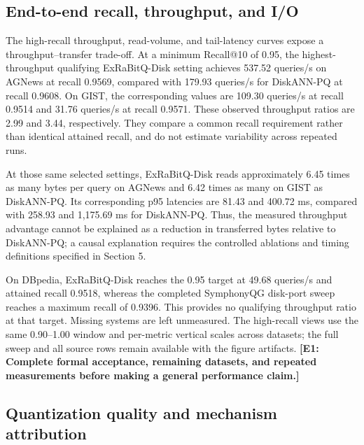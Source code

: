 \subsection{End-to-end recall, throughput, and I/O}




The high-recall throughput, read-volume, and tail-latency curves expose a throughput--transfer trade-off. At a minimum Recall@10 of 0.95, the highest-throughput qualifying ExRaBitQ-Disk setting achieves 537.52 queries/s on AGNews at recall 0.9569, compared with 179.93 queries/s for DiskANN-PQ at recall 0.9608. On GIST, the corresponding values are 109.30 queries/s at recall 0.9514 and 31.76 queries/s at recall 0.9571. These observed throughput ratios are 2.99 and 3.44, respectively. They compare a common recall requirement rather than identical attained recall, and do not estimate variability across repeated runs.

At those same selected settings, ExRaBitQ-Disk reads approximately 6.45 times as many bytes per query on AGNews and 6.42 times as many on GIST as DiskANN-PQ. Its corresponding p95 latencies are 81.43 and 400.72 ms, compared with 258.93 and 1,175.69 ms for DiskANN-PQ. Thus, the measured throughput advantage cannot be explained as a reduction in transferred bytes relative to DiskANN-PQ; a causal explanation requires the controlled ablations and timing definitions specified in Section 5.

On DBpedia, ExRaBitQ-Disk reaches the 0.95 target at 49.68 queries/s and attained recall 0.9518, whereas the completed SymphonyQG disk-port sweep reaches a maximum recall of 0.9396. This provides no qualifying throughput ratio at that target. Missing systems are left unmeasured. The high-recall views use the same 0.90--1.00 window and per-metric vertical scales across datasets; the full sweep and all source rows remain available with the figure artifacts. \textbf{[E1: Complete formal acceptance, remaining datasets, and repeated measurements before making a general performance claim.]}

\subsection{Quantization quality and mechanism attribution}


